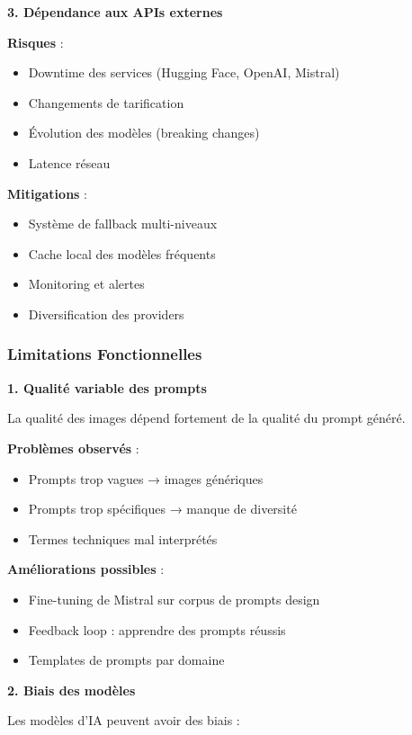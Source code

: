 \textbf{3. Dépendance aux APIs externes}

\textbf{Risques} :
\begin{itemize}[leftmargin=*]
    \item Downtime des services (Hugging Face, OpenAI, Mistral)
    \item Changements de tarification
    \item Évolution des modèles (breaking changes)
    \item Latence réseau
\end{itemize}

\textbf{Mitigations} :
\begin{itemize}[leftmargin=*]
    \item Système de fallback multi-niveaux
    \item Cache local des modèles fréquents
    \item Monitoring et alertes
    \item Diversification des providers
\end{itemize}

\subsubsection{Limitations Fonctionnelles}

\textbf{1. Qualité variable des prompts}

La qualité des images dépend fortement de la qualité du prompt généré.

\textbf{Problèmes observés} :
\begin{itemize}[leftmargin=*]
    \item Prompts trop vagues → images génériques
    \item Prompts trop spécifiques → manque de diversité
    \item Termes techniques mal interprétés
\end{itemize}

\textbf{Améliorations possibles} :
\begin{itemize}[leftmargin=*]
    \item Fine-tuning de Mistral sur corpus de prompts design
    \item Feedback loop : apprendre des prompts réussis
    \item Templates de prompts par domaine
\end{itemize}

\textbf{2. Biais des modèles}

Les modèles d'IA peuvent avoir des biais :

